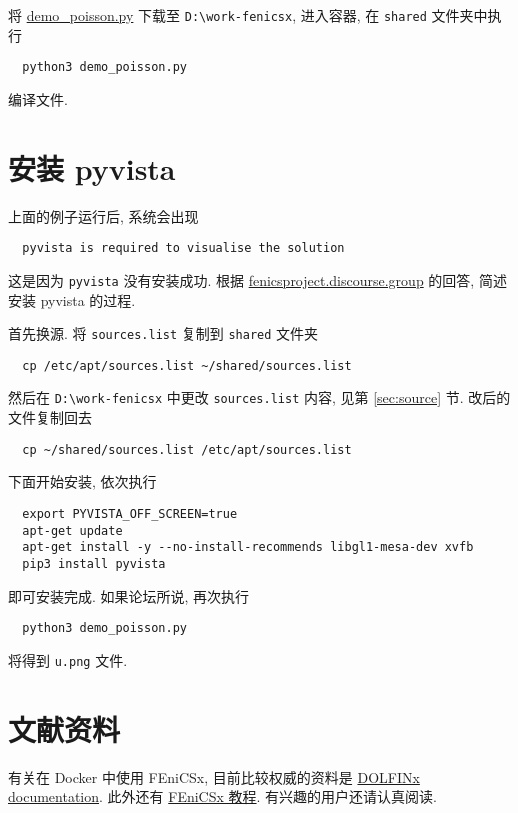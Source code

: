 \documentclass[fontset=founder]{ctexrep}
\begin{document}
将 \href{https://docs.fenicsproject.org/dolfinx/main/python/_downloads/756b4617c0f8921ed14fbd158af0c99c/demo_poisson.py}{demo\_poisson.py} 下载至 \texttt{D:\textbackslash work-fenicsx},
进入容器,
在 \texttt{shared} 文件夹中执行
\begin{lstlisting}
  python3 demo_poisson.py
\end{lstlisting}
编译文件.

\section{安装 pyvista}

上面的例子运行后,
系统会出现
\begin{lstlisting}
  pyvista is required to visualise the solution
\end{lstlisting}
这是因为 \texttt{pyvista} 没有安装成功.
根据 \href{https://fenicsproject.discourse.group/t/how-to-use-pyvista-in-docker-for-windows-10-user/6921}{fenicsproject.discourse.group} 的回答,
简述安装 pyvista 的过程.

首先换源.
将 \texttt{sources.list} 复制到 \texttt{shared} 文件夹
\begin{lstlisting}
  cp /etc/apt/sources.list ~/shared/sources.list
\end{lstlisting}
然后在 \texttt{D:\textbackslash work-fenicsx} 中更改 \texttt{sources.list} 内容,
见第 \ref{sec:source} 节.
改后的文件复制回去
\begin{lstlisting}
  cp ~/shared/sources.list /etc/apt/sources.list
\end{lstlisting}

下面开始安装,
依次执行
\begin{lstlisting}
  export PYVISTA_OFF_SCREEN=true
  apt-get update
  apt-get install -y --no-install-recommends libgl1-mesa-dev xvfb
  pip3 install pyvista
\end{lstlisting}
即可安装完成.
如果论坛所说,
再次执行
\begin{lstlisting}
  python3 demo_poisson.py
\end{lstlisting}
将得到 \texttt{u.png} 文件.

\section{文献资料}

有关在 Docker 中使用 FEniCSx,
目前比较权威的资料是  \href{https://docs.fenicsproject.org/dolfinx/main/python/index.html}{DOLFINx documentation}.
此外还有  \href{https://jorgensd.github.io/dolfinx-tutorial/index.html}{FEniCSx 教程}.
有兴趣的用户还请认真阅读.
\end{document}
